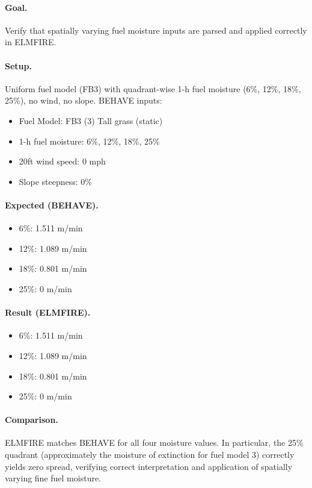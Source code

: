 \paragraph{Goal.} Verify that spatially varying fuel moisture inputs are parsed and applied correctly in ELMFIRE.

\paragraph{Setup.} Uniform fuel model (FB3) with quadrant-wise 1-h fuel moisture (6\%, 12\%, 18\%, 25\%), no wind, no slope. BEHAVE inputs:

\begin{itemize}
    \item Fuel Model: FB3 (3) Tall grass (static)
    \item 1-h fuel moisture: 6\%, 12\%, 18\%, 25\%
    \item 20ft wind speed: 0 mph
    \item Slope steepness: 0\%
\end{itemize}

\paragraph{Expected (BEHAVE).}
\begin{itemize}
    \item 6\%: 1.511 m/min
    \item 12\%: 1.089 m/min
    \item 18\%: 0.801 m/min
    \item 25\%: 0 m/min
\end{itemize}

\paragraph{Result (ELMFIRE).}
\begin{itemize}
    \item 6\%: 1.511 m/min
    \item 12\%: 1.089 m/min
    \item 18\%: 0.801 m/min
    \item 25\%: 0 m/min
\end{itemize}

\paragraph{Comparison.} ELMFIRE matches BEHAVE for all four moisture values. In particular, the 25\% quadrant (approximately the moisture of extinction for fuel model 3) correctly yields zero spread, verifying correct interpretation and application of spatially varying fine fuel moisture.


